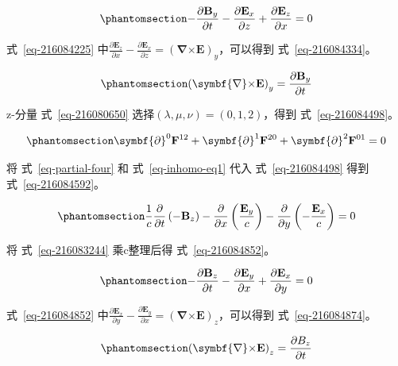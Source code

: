 \documentclass[
  chinese,
  a4paper,
  UTF8,
  12pt,
  oneside,
  openany]{ctexbook}
\begin{document}
\begin{equation}\protect\phantomsection\label{eq-216084225}{
- \frac{\partial\mathbf{B}_{y}}{\partial t} - \frac{\partial\mathbf{E}_{x}}{\partial z} + \frac{\partial\mathbf{E}_{z}}{\partial x} = 0
}\end{equation}

式~\ref{eq-216084225}
中\(\frac{\partial\mathbf{E}_{z}}{\partial x} - \frac{\partial\mathbf{E}_{x}}{\partial z} = \left( \symbf{\nabla}\mathbf{\times E} \right)_{y}\)，可以得到
式~\ref{eq-216084334}。

\begin{equation}\protect\phantomsection\label{eq-216084334}{
\left( \symbf{\nabla}\mathbf{\times E} \right)_{y} = \frac{\partial\mathbf{B}_{y}}{\partial t}
}\end{equation}

z-分量 式~\ref{eq-216080650} 选择\((\lambda,\mu,\nu) = (0,1,2)\)，得到
式~\ref{eq-216084498}。

\begin{equation}\protect\phantomsection\label{eq-216084498}{
\symbf{\partial}^{0}\mathbf{F}^{12} + \symbf{\partial}^{1}\mathbf{F}^{20} + \symbf{\partial}^{2}\mathbf{F}^{01} = 0
}\end{equation}

将 式~\ref{eq-partial-four} 和 式~\ref{eq-inhomo-eq1} 代入
式~\ref{eq-216084498} 得到 式~\ref{eq-216084592}。

\begin{equation}\protect\phantomsection\label{eq-216084592}{
\frac{1}{c}\frac{\partial}{\partial t}\left( - \mathbf{B}_{z} \right) - \frac{\partial}{\partial x}\left( \frac{\mathbf{E}_{y}}{c} \right) - \frac{\partial}{\partial y}\left( - \frac{\mathbf{E}_{x}}{c} \right) = 0
}\end{equation}

将 式~\ref{eq-216083244} 乘c整理后得 式~\ref{eq-216084852}。

\begin{equation}\protect\phantomsection\label{eq-216084852}{
- \frac{\partial\mathbf{B}_{z}}{\partial t} - \frac{\partial\mathbf{E}_{y}}{\partial x} + \frac{\partial\mathbf{E}_{x}}{\partial y} = 0
}\end{equation}

式~\ref{eq-216084852}
中\(\frac{\partial\mathbf{E}_{x}}{\partial y} - \frac{\partial\mathbf{E}_{y}}{\partial x} = \left( \symbf{\nabla}\mathbf{\times E} \right)_{z}\)，可以得到
式~\ref{eq-216084874}。

\begin{equation}\protect\phantomsection\label{eq-216084874}{
\left( \symbf{\nabla}\mathbf{\times E} \right)_{z} = \frac{\partial B_{z}}{\partial t}
}\end{equation}
\end{document}

